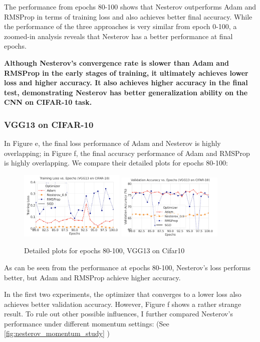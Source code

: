 \documentclass[12pt]{article}
\begin{document}
The performance from epochs 80-100 shows that Nesterov outperforms Adam and RMSProp in terms of training loss and also achieves better final accuracy. While the performance of the three approaches is very similar from epoch 0-100, a zoomed-in analysis reveals that Nesterov has a better performance at final epochs.

\textbf{Although Nesterov's convergence rate is slower than Adam and RMSProp in the early stages of training, it ultimately achieves lower loss and higher accuracy. It also achieves higher accuracy in the final test, demonstrating Nesterov has better generalization ability on the CNN on CIFAR-10 task.}



\subsubsection{VGG13 on CIFAR-10}

In Figure e, the final loss performance of Adam and Nesterov is highly overlapping; in Figure f, the final accuracy performance of Adam and RMSProp is highly overlapping. We compare their detailed plots for epochs 80-100:

\begin{figure}[H]
    \centering
    \includegraphics[width=0.45\textwidth]{3-1.png}
    \includegraphics[width=0.45\textwidth]{3-2.png}
    \caption{Detailed plots for epochs 80-100, VGG13 on Cifar10}
    \label{fig:detailed_vgg13_on_cifar10}
\end{figure}

As can be seen from the performance at epochs 80-100, Nesterov's loss performs better, but Adam and RMSProp achieve higher accuracy.

In the first two experiments, the optimizer that converges to a lower loss also achieves better validation accuracy. However, Figure f shows a rather strange result. To rule out other possible influences, I further compared Nesterov's performance under different momentum settings: (See \ref{fig:nesterov_momentum_study}
)
\end{document}

